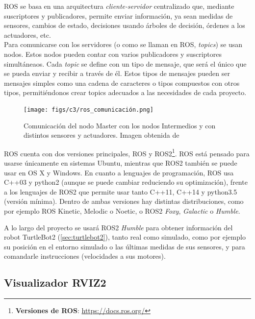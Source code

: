 ROS se basa en una arquitectura \textit{cliente-servidor} centralizado que, mediante suscriptores y publicadores, permite enviar información,
ya sean medidas de sensores, cambios de estado, decisiones usando árboles de decisión, órdenes a los actuadores, etc.\\

Para comunicarse con los servidores (o como se llaman en ROS, \textit{topics}) se usan nodos. Estos nodos pueden contar con varios publicadores y suscriptores
simultáneaos.
Cada \textit{topic} se define con un tipo de mensaje, que será el único que se pueda enviar y recibir a través de él. Estos tipos de mensajes pueden ser
mensajes simples como una cadena de caracteres o tipos compuestos con otros tipos, permitiéndonos crear topics adecuados a las necesidades de cada proyecto.

\begin{figure} [H]
    \begin{center}
        \texttt{[image: figs/c3/ros\_comunicación.png]}
    \end{center}
    \caption[Comunicación entre nodos ROS.]{Comunicación del nodo Master con los nodos Intermedios y con distintos sensores y actuadores. Imagen obtenida de \cite{comunicacion_ros2}}
    \label{fig:ros_master_comunicacion}
\end{figure}
ROS cuenta con dos versiones principales, ROS y ROS2\footnote{\textbf{Versiones de ROS}: \url{https://docs.ros.org/}}. ROS está pensado para usarse
únicamente en sistemas Ubuntu, mientras que ROS2 también se puede usar en OS X y Windows. En cuanto a lenguajes de programación, ROS usa C++03 y
python2 (aunque se puede cambiar reduciendo su optimización), frente a los lenguajes de ROS2 que permite usar tanto C++11, C++14 y python3.5 (versión mínima).
Dentro de ambas versiones hay distintas distribuciones, como por ejemplo ROS Kinetic, Melodic o Noetic, o ROS2 \textit{Foxy}, \textit{Galactic} o \textit{Humble}.

A lo largo del proyecto se usará ROS2 \textit{Humble} para obtener información del robot TurtleBot2 (\ref{sec:turtlebot2}), tanto real como simulado,
como por ejemplo su posición en el entorno simulado o las últimas medidas de sus sensores, y para comandarle instrucciones (velocidades a sus motores).

\subsection{Visualizador RVIZ2}
\label{subsec:rviz2}

